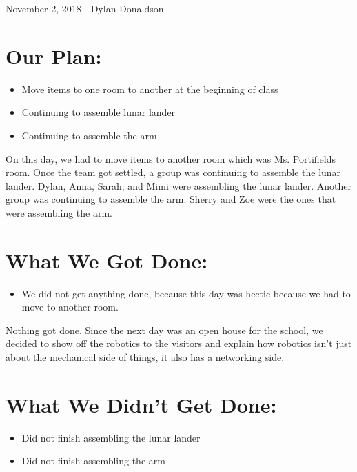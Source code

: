 \documentclass[12pt]{article}
\begin{document}
November 2, 2018 - Dylan Donaldson

\section{Our Plan:} %
\begin{itemize}
	\item Move items to one room to another at the beginning of class
	\item Continuing to assemble lunar lander
	\item Continuing to assemble the arm

\end{itemize}

On this day, we had to move items to another room which was Ms. Portifields room. Once the team got settled, a group was continuing to assemble the lunar lander. Dylan, Anna, Sarah, and Mimi were assembling the lunar lander.  Another group was continuing to assemble the arm. Sherry and Zoe were the ones that were assembling the arm.  

\section{What We Got Done:} %
\begin{itemize}
	\item We did not get anything done, because this day was hectic because we had to move to another room.
\end{itemize}

Nothing got done. Since the next day was an open house for the school, we decided to show off the robotics to the visitors and explain how robotics isn't just about the mechanical side of things, it also has a networking side.
\section{What We Didn't Get Done:} %
\begin{itemize}
	\item Did not finish assembling the lunar lander
	\item Did not finish assembling the arm
\end{itemize}
\end{document}

